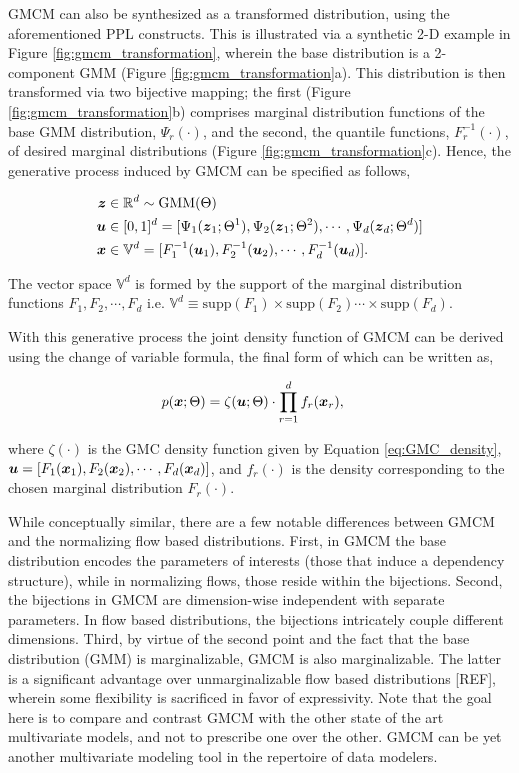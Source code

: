 \documentclass{article}
\begin{document}
 

GMCM can also be synthesized as a transformed distribution, using the aforementioned PPL constructs. This is illustrated via a synthetic 2-D example in Figure \ref{fig:gmcm_transformation}, wherein the base distribution is a 2-component GMM (Figure \ref{fig:gmcm_transformation}a). This distribution is then transformed via two bijective mapping; the first (Figure \ref{fig:gmcm_transformation}b) comprises marginal distribution functions of the base GMM distribution, $\Psi_r(\cdot)$, and the second, the quantile functions, $F^{-1}_r(\cdot)$, of desired marginal distributions (Figure \ref{fig:gmcm_transformation}c). Hence, the generative process induced by GMCM can be specified as follows,

\begin{align*}
\boldsymbol{z}& \in \mathbb{R}^d  \sim \text{GMM}(\Theta) \\
\boldsymbol{u}& \in [0,1]^d = [\Psi_1(\boldsymbol{z}_1;\Theta^1), \Psi_2(\boldsymbol{z}_1;\Theta^2), \cdots, \Psi_d(\boldsymbol{z}_d;\Theta^d)] \\
\boldsymbol{x}& \in \mathbb{V}^d = [F^{-1}_1(\boldsymbol{u}_1), F^{-1}_2(\boldsymbol{u}_2), \cdots, F^{-1}_d(\boldsymbol{u}_d)].
\end{align*}

The vector space $\mathbb{V}^d$ is formed by the support of the marginal distribution functions $F_1, F_2,\cdots, F_d$ i.e. $\mathbb{V}^d \equiv \text{supp}(F_1)\times \text{supp}(F_2)\cdots\times \text{supp}(F_d)$.

With this generative process the joint density function of GMCM can be derived using the change of variable formula, the final form of which can be written as,

\begin{align}\label{eq:GMCM_density}
p(\boldsymbol{x};\Theta)&= \zeta(\boldsymbol{u};\Theta) \cdot \prod\limits_{r=1}^{d}f_r(\boldsymbol{x}_r),
\end{align}

where $\zeta(\cdot)$ is the GMC density function given by Equation \eqref{eq:GMC_density}, $\boldsymbol{u} = [F_1(\boldsymbol{x}_1), F_2(\boldsymbol{x}_2), \cdots, F_d(\boldsymbol{x}_d) ]$, and $f_r(\cdot)$ is the density corresponding to the chosen marginal distribution $F_r(\cdot)$.

While conceptually similar, there are a few notable differences between GMCM and the normalizing flow based distributions. First, in GMCM the base distribution encodes the parameters of interests (those that induce a dependency structure), while in normalizing flows, those reside within the bijections. Second, the bijections in GMCM are dimension-wise independent with separate parameters. In flow based distributions, the bijections intricately couple different dimensions. Third, by virtue of the second point and the fact that the base distribution (GMM) is marginalizable, GMCM is also marginalizable. The latter is a significant advantage over unmarginalizable flow based distributions [REF], wherein some flexibility is sacrificed in favor of expressivity. Note that the goal here is to compare and contrast GMCM with the other state of the art multivariate models, and not to prescribe one over the other. GMCM can be yet another multivariate modeling tool in the repertoire of data modelers.
\end{document}
